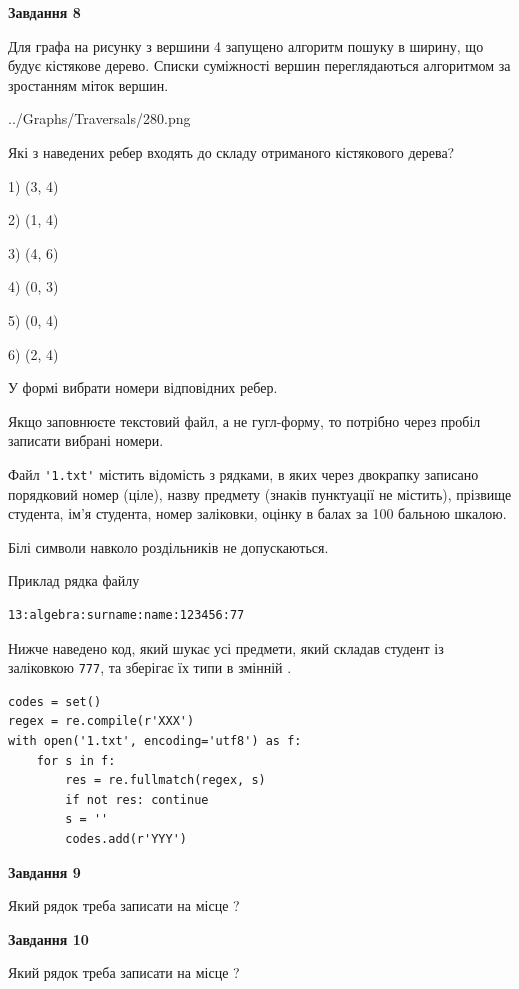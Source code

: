 \documentclass[12pt, ukrainian]{article}
\def\code#1{\Verb!#1!}
\begin{document}
{\begin {large}
{\begin {center}\textbf{Завдання 8}\end {center}}\par
Для графа на рисунку з вершини 4 запущено алгоритм пошуку в ширину, що будує кістякове дерево. Списки суміжності вершин переглядаються алгоритмом за зростанням міток вершин.\par
\begin{center}
	{../Graphs/Traversals/280.png}
\end{center}
\par Які з наведених ребер входять до складу отриманого кістякового дерева?\par
1) (3, 4)\par
2) (1, 4)\par
3) (4, 6)\par
4) (0, 3)\par
5) (0, 4)\par
6) (2, 4)\par
{\vskip 15pt} У формі вибрати номери відповідних ребер.


Якщо заповнюєте текстовий файл, а не гугл-форму, то потрібно через пробіл записа\-ти вибрані номери.\par
\newpage


Файл \code{'1.txt'} містить відомість з рядками, в яких через двокрапку записано поряд\-ковий номер (ціле), назву предмету (знаків пунктуації не містить), прізвище студента, ім'я студента, номер заліковки, оцінку в балах за 100 бальною шкалою.

Білі символи навколо роздільників не допускаються.

Приклад рядка файлу



\begin{verbatim}
13:algebra:surname:name:123456:77
\end{verbatim}


Нижче наведено код, який шукає усі предмети, який складав студент із заліковкою \code{777}, та зберігає їх типи в змінній .



\begin{verbatim}
codes = set()
regex = re.compile(r'XXX')
with open('1.txt', encoding='utf8') as f:
    for s in f:
        res = re.fullmatch(regex, s)
        if not res: continue
        s = ''
        codes.add(r'YYY')
\end{verbatim}


{\begin {center}\textbf{Завдання 9}\end {center}}\par
Який рядок треба записати на місце  ?\par
\vspace{5mm}


{\begin {center}\textbf{Завдання 10}\end {center}}\par
Який рядок треба записати на місце  ?\par


\newpage


\end {large}}
\end{document}
